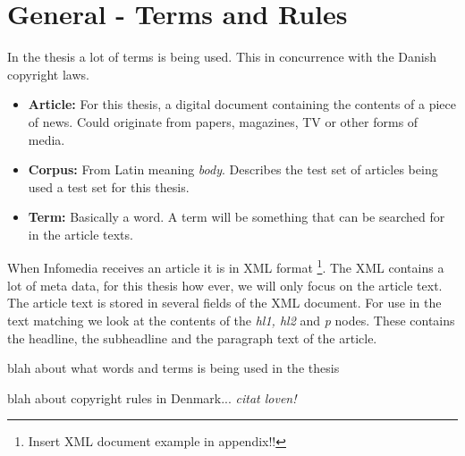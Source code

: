 \chapter{General - Terms and Rules}
In the thesis a lot of terms is being used. This in concurrence with the Danish copyright laws.
\begin{itemize}
\item \textbf{Article:} For this thesis, a digital document containing the contents of a piece of news. Could originate from papers, magazines, TV or other forms of media.
\item \textbf{Corpus:} From Latin meaning \textit{body}. Describes the test set of articles being used a test set for this thesis.
\item \textbf{Term:} Basically a word. A term will be something that can be searched for in the article texts.
\end{itemize}

When Infomedia receives an article it is in XML format \footnote{Insert XML document example in appendix!!}.
The XML contains a lot of meta data, for this thesis how ever, we will only focus on the article text. The article text is stored in several fields of the XML document. For use in the text matching we look at the contents of the \textit{hl1, hl2} and \textit{p} nodes. These contains the headline, the subheadline and the paragraph text of the article.

blah about what words and terms is being used in the thesis

blah about copyright rules in Denmark... \textit{citat loven!}
